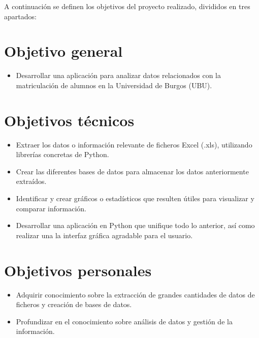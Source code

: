 
A continuación se definen los objetivos del proyecto realizado, divididos en tres apartados:


\section{Objetivo general}\label{objetivo-general}

\begin{itemize}

\item
  Desarrollar una aplicación para analizar datos relacionados con la matriculación de alumnos en la Universidad de Burgos (UBU).
  
\end{itemize}



\section{Objetivos técnicos}\label{objetivos-tecnicos}

\begin{itemize}

\item
  Extraer los datos o información relevante de ficheros Excel (.xls), utilizando librerías concretas de Python.
\item
  Crear las diferentes bases de datos para almacenar los datos anteriormente extraídos. 
\item
  Identificar y crear gráficos o estadísticos que resulten útiles para visualizar y comparar información.
\item
  Desarrollar una aplicación en Python que unifique todo lo anterior, así como realizar una la interfaz gráfica agradable para el usuario.

\end{itemize} 

  
\section{Objetivos personales}\label{objetivos-personales}

\begin{itemize}

\item
  Adquirir conocimiento sobre la extracción de grandes cantidades de datos de ficheros y creación de bases de datos.
\item
  Profundizar en el conocimiento sobre análisis de datos y gestión de la información.


\end{itemize}

